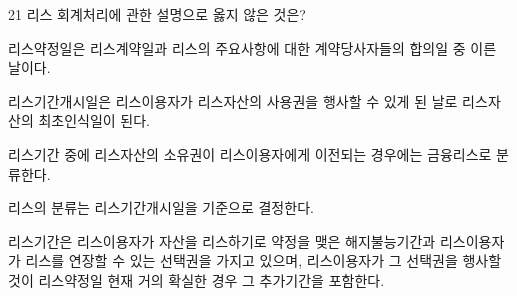 \begin{question}{21}
리스 회계처리에 관한 설명으로 옳지 않은 것은?
\begin{choices}
  \item 리스약정일은 리스계약일과 리스의 주요사항에 대한 계약당사자들의 합의일 중 이른 날이다.
  \item 리스기간개시일은 리스이용자가 리스자산의 사용권을 행사할 수 있게 된 날로 리스자산의 최초인식일이 된다.
  \item 리스기간 중에 리스자산의 소유권이 리스이용자에게 이전되는 경우에는 금융리스로 분류한다.
  \item 리스의 분류는 리스기간개시일을 기준으로 결정한다.
  \item 리스기간은 리스이용자가 자산을 리스하기로 약정을 맺은 해지불능기간과 리스이용자가 리스를 연장할 수 있는 선택권을 가지고 있으며, 리스이용자가 그 선택권을 행사할 것이 리스약정일 현재 거의 확실한 경우 그 추가기간을 포함한다.
\end{choices}
\end{question}
